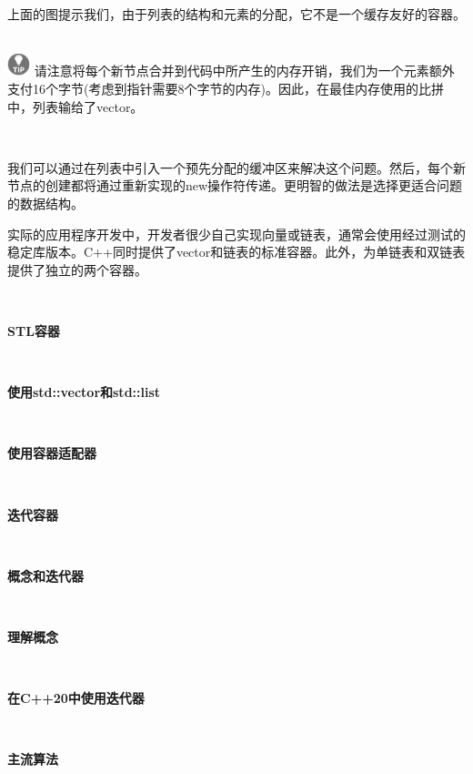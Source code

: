 上面的图提示我们，由于列表的结构和元素的分配，它不是一个缓存友好的容器。 \par

\hspace*{\fill} \\ %
\includegraphics[width=0.05\textwidth]{images/tip}
请注意将每个新节点合并到代码中所产生的内存开销，我们为一个元素额外支付16个字节(考虑到指针需要8个字节的内存)。因此，在最佳内存使用的比拼中，列表输给了vector。 \par
\noindent\textbf{}\ \par

我们可以通过在列表中引入一个预先分配的缓冲区来解决这个问题。然后，每个新节点的创建都将通过重新实现的new操作符传递。更明智的做法是选择更适合问题的数据结构。 \par
实际的应用程序开发中，开发者很少自己实现向量或链表，通常会使用经过测试的稳定库版本。C++同时提供了vector和链表的标准容器。此外，为单链表和双链表提供了独立的两个容器。 \par

\noindent\textbf{}\ \par
\textbf{STL容器} \ \par

\noindent\textbf{}\ \par
\textbf{使用std::vector和std::list} \ \par

\noindent\textbf{}\ \par
\textbf{使用容器适配器} \ \par

\noindent\textbf{}\ \par
\textbf{迭代容器} \ \par

\noindent\textbf{}\ \par
\textbf{概念和迭代器} \ \par

\noindent\textbf{}\ \par
\textbf{理解概念} \ \par

\noindent\textbf{}\ \par
\textbf{在C++20中使用迭代器} \ \par

\noindent\textbf{}\ \par
\textbf{主流算法} \ \par

